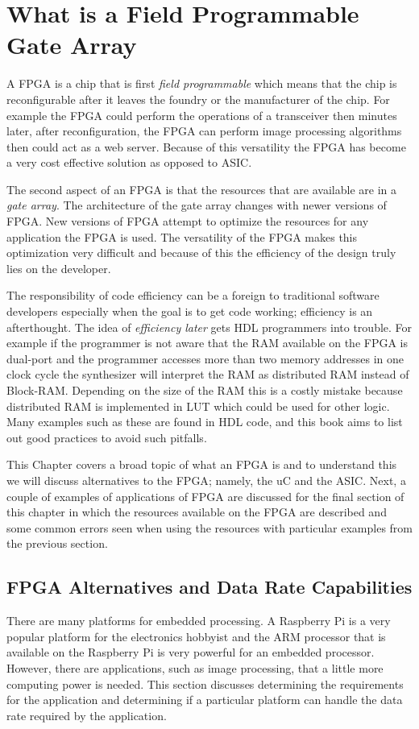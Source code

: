 \chapter{What is a Field Programmable Gate Array}
A \ac{FPGA} is a chip that is first \emph{field programmable} which means that the chip is reconfigurable after it leaves the foundry or the manufacturer of the chip. For example the \ac{FPGA} could perform the operations of a transceiver then minutes later, after reconfiguration, the \ac{FPGA} can perform image processing algorithms then could act as a web server. Because of this versatility the \ac{FPGA} has become a very cost effective solution as opposed to \ac{ASIC}.

The second aspect of an \ac{FPGA} is that the resources that are available are in a \emph{gate array}. The architecture of the gate array changes with newer versions of \ac{FPGA}. New versions of \ac{FPGA} attempt to optimize the resources for any application the \ac{FPGA} is used. The versatility of the \ac{FPGA} makes this optimization very difficult and because of this the efficiency of the design truly lies on the developer.

The responsibility of code efficiency can be a foreign to traditional software developers especially when the goal is to get code working; efficiency is an afterthought. The idea of \emph{efficiency later} gets \ac{HDL} programmers into trouble. For example if the programmer is not aware that the \ac{RAM} available on the \ac{FPGA} is dual-port and the programmer accesses more than two memory addresses in one clock cycle the synthesizer will interpret the \ac{RAM} as distributed \ac{RAM} instead of Block-\ac{RAM}. Depending on the size of the \ac{RAM} this is a costly mistake because distributed \ac{RAM} is implemented in \ac{LUT} which could be used for other logic. Many examples such as these are found in \ac{HDL} code, and this book aims to list out good practices to avoid such pitfalls.

This Chapter covers a broad topic of what an \ac{FPGA} is and to understand this we will discuss alternatives to the \ac{FPGA}; namely, the \ac{uC} and the \ac{ASIC}. Next, a couple of examples of applications of \ac{FPGA} are discussed for the final section of this chapter in which the resources available on the \ac{FPGA} are described and some common errors seen when using the resources with particular examples from the previous section. 


\section{FPGA Alternatives and Data Rate Capabilities}
There are many platforms for embedded processing. A Raspberry Pi is a very popular platform for the electronics hobbyist and the ARM processor that is available on the Raspberry Pi is very powerful for an embedded processor. However, there are applications, such as image processing, that a little more computing power is needed. This section discusses determining the requirements for the application and determining if a particular platform can handle the data rate required by the application. 

